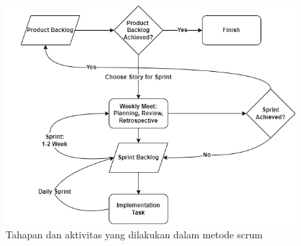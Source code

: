 \begin{figure}[H]
	\centering
	\includegraphics[keepaspectratio, width=11cm]{gambar/scrumflow}
	\caption{Tahapan dan aktivitas yang dilakukan dalam metode scrum}
	\label{gambar:scrumflow}
\end{figure}

